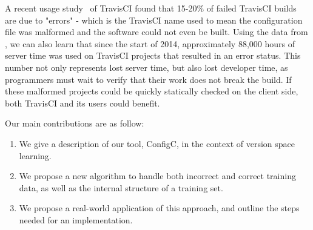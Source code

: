 A recent usage study~\cite{API} of TravisCI found that 15-20\% of failed TravisCI builds are due to "errors" - which is the TravisCI name used to mean the configuration file was malformed and the software could not even be built.
Using the data from \cite{API}, we can also learn that since the start of 2014, approximately 88,000 hours of server time was used on TravisCI projects that resulted in an error status.
This number not only represents lost server time, but also lost developer time, as programmers must wait to verify that their work does not break the build.
If these malformed projects could be quickly statically checked on the client side, both TravisCI and its users could benefit.

Our main contributions are as follow:

\begin{enumerate}

\item We give a description of our tool, ConfigC, in the context of version space learning.
\item We propose a new algorithm to handle both incorrect and correct training data, as well as the internal structure of a training set.
\item We propose a real-world application of this approach, and outline the steps needed for an implementation.

\end{enumerate} 
